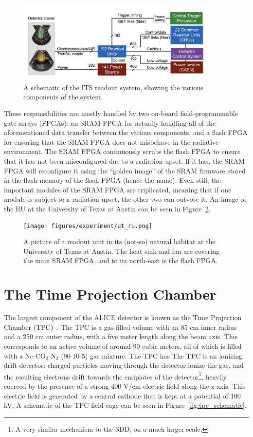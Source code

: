 \begin{figure}[h!]
    \centering
    \includegraphics[width=0.9\textwidth]{figures/experiment/its_readout.png}
    \caption{A schematic of the ITS readout system, showing the various components of the system.}
    \label{fig:its_readout}
\end{figure}

These responsibilities are mostly handled by two on-board field-programmable gate arrays (FPGAs): an SRAM FPGA for actually handling all of the aforementioned data transfer between the various components, and a flash FPGA for ensuring that the SRAM FPGA does not misbehave in the radiative environment. The SRAM FPGA continuously scrubs the flash FPGA to ensure that it has not been misconfigured due to a radiation upset. If it has, the SRAM FPGA will reconfigure it using the ``golden image'' of the SRAM firmware stored in the flash memory of the flash FPGA (hence the name). Even still, the important modules of the SRAM FPGA are triplicated, meaning that if one module is subject to a radiation upset, the other two can outvote it. An image of the RU at the University of Texas at Austin can be seen in Figure~\ref{fig:ut_ru}.

\begin{figure}
    \centering
    \texttt{[image: figures/experiment/ut\_ru.png]}
    \caption{A picture of a readout unit in its (not-so) natural habitat at the University of Texas at Austin. The heat sink and fan are covering the main SRAM FPGA, and to its north-east is the flash FPGA.}
    \label{fig:ut_ru}
\end{figure}

\section{The Time Projection Chamber}
\label{sec:tpc}
The largest component of the ALICE detector is known as the Time Projection Chamber (TPC)~\cite{TPC1, TPC2}. The TPC is a gas-filled volume with an 85 cm inner radius and a 250 cm outer radius, with a five meter length along the beam axis. This corresponds to an active volume of around 90 cubic meters, all of which is filled with a Ne-CO$_2$-N$_2$ (90-10-5) gas mixture. The TPC has The TPC is an ionizing drift detector: charged particles moving through the detector ionize the gas, and the resulting electrons drift towards the endplates of the detector\footnote{A very similar mechanism to the SDD, on a much larger scale.}, heavily coerced by the presence of a strong 400 V/cm electric field along the z-axis. This electric field is generated by a central cathode that is kept at a potential of 100 kV. A schematic of the TPC field cage can be seen in Figure~\ref{fig:tpc_schematic}.

